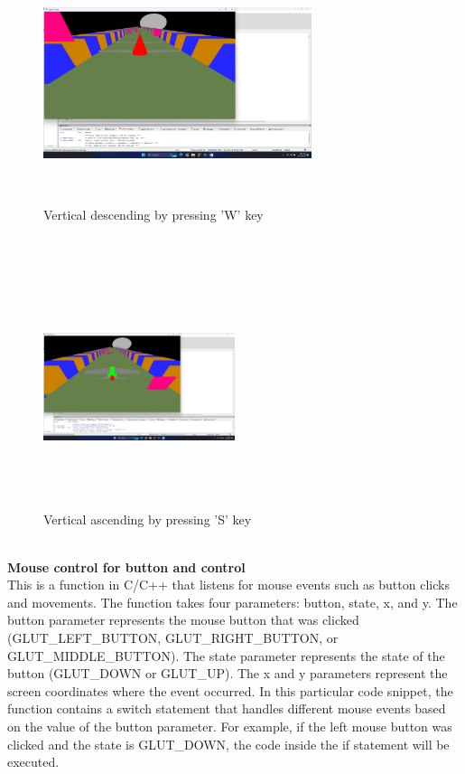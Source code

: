 \documentclass[12pt,a4]{article}
\begin{document}
{\begin{figure}[h]
    \centering
    \includegraphics[width=0.7\textwidth, height=7cm]{Screenshot (66).png}
    \caption{Vertical descending by pressing 'W' key}
    \label{fig:my_label}
\end{figure}\\

\begin{figure}[h]
    \centering
    \includegraphics[width=0.5\textwidth, height=7cm]{Screenshot (67).png}
    \caption{Vertical ascending by pressing 'S' key}
    \label{fig:my_label}
\end{figure}\\

\newpage
\textbf{\Large{Mouse control for button and control}}\\
This is a function in C/C++ that listens for mouse events such as button clicks and movements. The function takes four parameters: button, state, x, and y. The button parameter represents the mouse button that was clicked (GLUT\_LEFT\_BUTTON, GLUT\_RIGHT\_BUTTON, or GLUT\_MIDDLE\_BUTTON). The state parameter represents the state of the button (GLUT\_DOWN or GLUT\_UP). The x and y parameters represent the screen coordinates where the event occurred.
In this particular code snippet, the function contains a switch statement that handles different mouse events based on the value of the button parameter. For example, if the left mouse button was clicked and the state is GLUT\_DOWN, the code inside the if statement will be executed.

}
\end{document}

